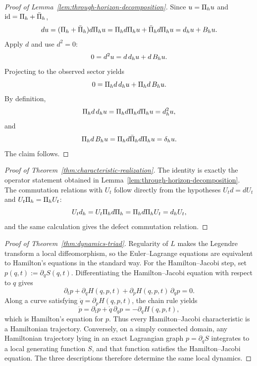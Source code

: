 \begin{proof}[Proof of Lemma~\ref{lem:through-horizon-decomposition}]
\label{proof:lem:through-horizon-decomposition}
Since $u=\CCPi{h}u$ and $\id=\CCPi{h}+\CCPibar{h}$,
\[
du = (\CCPi{h}+\CCPibar{h})d\CCPi{h}u
   = \CCPi{h}d\CCPi{h}u + \CCPibar{h}d\CCPi{h}u
   = \CCObs{d}{h}u + \CCLeak{d}{h}u.
\]
Apply $d$ and use $d^2=0$:
\[
0 = d^2u = d\,\CCObs{d}{h}u + d\,\CCLeak{d}{h}u.
\]
Projecting to the observed sector yields
\[
0 = \CCPi{h}d\,\CCObs{d}{h}u + \CCPi{h}d\,\CCLeak{d}{h}u.
\]
By definition,
\[
\CCPi{h}d\,\CCObs{d}{h}u
= \CCPi{h}d\CCPi{h}d\CCPi{h}u
= \CCObs{d}{h}^2u,
\]
and
\[
\CCPi{h}d\,\CCLeak{d}{h}u
= \CCPi{h}d\CCPibar{h}d\CCPi{h}u
= \CCDefect{d}{h}u.
\]
The claim follows.
\end{proof}

\begin{proof}[Proof of Theorem~\ref{thm:characteristic-realization}]
\label{proof:thm:characteristic-realization}
The identity is exactly the operator statement obtained in
Lemma~\ref{lem:through-horizon-decomposition}. The commutation relations with
$U_t$ follow directly from the hypotheses
$U_t d = d U_t$ and $U_t \CCPi{h} = \CCPi{h} U_t$:
\[
U_t \CCObs{d}{h}
= U_t \CCPi{h} d \CCPi{h}
= \CCPi{h} d \CCPi{h} U_t
= \CCObs{d}{h} U_t,
\]
and the same calculation gives the defect commutation relation.
\end{proof}

\begin{proof}[Proof of Theorem~\ref{thm:dynamics-triad}]
\label{proof:thm:dynamics-triad}
Regularity of $L$ makes the Legendre transform a local diffeomorphism, so the
Euler--Lagrange equations are equivalent to Hamilton's equations in the
standard way. For the Hamilton--Jacobi step, set
$p(q,t):=\partial_q S(q,t)$. Differentiating the Hamilton--Jacobi equation with
respect to $q$ gives
\[
\partial_t p + \partial_q H(q,p,t) + \partial_p H(q,p,t)\,\partial_q p = 0.
\]
Along a curve satisfying $\dot q=\partial_p H(q,p,t)$, the chain rule yields
\[
\dot p = \partial_t p + \dot q\,\partial_q p = -\partial_q H(q,p,t),
\]
which is Hamilton's equation for $p$. Thus every Hamilton--Jacobi
characteristic is a Hamiltonian trajectory. Conversely, on a simply connected
domain, any Hamiltonian trajectory lying in an exact Lagrangian graph
$p=\partial_q S$ integrates to a local generating function $S$, and that
function satisfies the Hamilton--Jacobi equation. The three descriptions
therefore determine the same local dynamics.
\end{proof}

